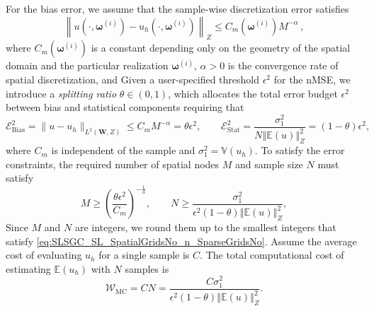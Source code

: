 %
For the bias error, we assume that the sample-wise discretization error satisfies
%
\begin{equation*} \label{eq:Assumption_uhA}
\left\|u\left(\cdot, \boldsymbol\omega^{(i)}\right)-u_h\left(\cdot,\boldsymbol\omega^{(i)}\right)\right\|_Z\leq C_m\left(\boldsymbol\omega^{(i)}\right)M^{-\alpha}\,,
\end{equation*}
%
where $C_m(\boldsymbol\omega^{(i)})$ is a constant depending only on the geometry of the spatial domain and the particular realization $\boldsymbol\omega^{(i)}$, $\alpha>0$ is the convergence rate of spatial discretization, and  Given a user-specified threshold $\epsilon^2$  for the nMSE, we introduce a {\it splitting ratio} $\theta \in (0,1)$, which allocates the total error budget $\epsilon^2$ between bias and statistical components requiring that
%
\begin{equation} \label{eq:error-budget}
\mathcal{E}_{\text{Bias}}^2=\|u-u_h\|_{L^2(\boldsymbol W,Z)}\le C_mM^{-\alpha}= \theta\epsilon^2, \quad\quad \mathcal{E}_{\text{Stat}}^2 = \frac{\sigma_1^2}{N\left\Vert\mathbb{E}(u) \right\Vert_{Z}^2}=(1-\theta)\epsilon^2,
\end{equation}
where $C_m$ is independent of the sample and $\sigma_1^2 = \mathbb{V}\left( u_{h}\right)$. To satisfy the error constraints,  the required number of spatial nodes $M$ and sample size $N$ must satisfy
%
\begin{equation}
\label{eq:SLSGC_SL_SpatialGridsNo_n_SparseGridsNo}
M\ge \left(\frac{\theta\epsilon^2}{C_m}\right)^{-\frac 1 {\alpha}},\quad\quad  N \ge  \frac{\sigma_1^2}{\epsilon^2(1-\theta)\left\Vert\mathbb{E}(u) \right\Vert_{Z}^2},
\end{equation}
%
Since $M$ and $N$ are integers, we round them up to the smallest integers that satisfy \eqref{eq:SLSGC_SL_SpatialGridsNo_n_SparseGridsNo}. Assume the average cost of evaluating $u_{h}$ for a single sample is $C$. The total computational cost of estimating $\mathbb{E}\left(u_h\right)$ with $N$ samples is
%
\[
\mathcal{W}_\text{MC}  = CN=\frac{C\sigma_1^2}{\epsilon^2(1-\theta)\left\Vert\mathbb{E}(u) \right\Vert_{Z}^2}.
\]
%